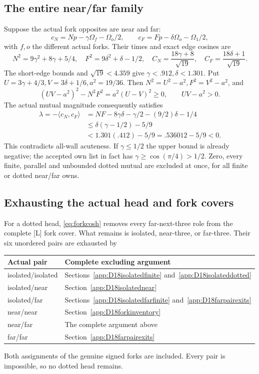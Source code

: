 \documentclass[11pt]{article}
\theoremstyle{definition}
\theoremstyle{remark}
\newcommand{\ip}[2]{\langle #1,#2\rangle}
\newcommand{\src}[1]{\textnormal{\textsf{[#1]}}}
\begin{document}
\subsection{The entire near/far family}
Suppose the actual fork opposites are near and far:
\[
 c_N=Np-\gamma\Omega_f-\Omega_o/2,\qquad
 c_F=Fp-\delta\Omega_o-\Omega_1/2,
\]
with \(f,o\) the different actual forks.
Their times and exact edge cosines are
\[
 N^2=9\gamma^2+8\gamma+5/4,\quad
 F^2=9\delta^2+\delta-1/2,\quad
 C_N=\frac{18\gamma+8}{\sqrt{19}},\quad
 C_F=\frac{18\delta+1}{\sqrt{19}}.
\]
The short-edge bounds and \(\sqrt{19}<4.359\) give
\(\gamma<.912,\delta<1.301\).
Put \(U=3\gamma+4/3,V=3\delta+1/6,a^2=19/36\).
Then \(N^2=U^2-a^2,F^2=V^2-a^2\), and
\[
 (UV-a^2)^2-N^2F^2=a^2(U-V)^2\geq0,\qquad UV-a^2>0.
\]
The actual mutual magnitude consequently satisfies
\begin{align*}
 \lambda=-\ip{c_N}{c_F}
 &=NF-8\gamma\delta-\gamma/2-(9/2)\delta-1/4\\
 &\leq\delta(\gamma-1/2)-5/9\\
 &<1.301(.412)-5/9=.536012-5/9<0.
\end{align*}
This contradicts all-wall acuteness. If \(\gamma\leq1/2\)
the upper bound is already negative; the accepted own list
in fact has \(\gamma\geq\cos(\pi/4)>1/2\).
Zero, every finite, parallel and unbounded dotted mutual
are excluded at once, for all finite or dotted near/far owns.

\subsection{Exhausting the actual head and fork covers}
For a dotted head, \eqref{eq:forkcosh} removes every
far-next-three role from the complete \src{L} fork cover.
What remains is isolated, near-three, or far-three.
Their six unordered pairs are exhausted by
\begin{center}\small
\begin{tabular}{ll}
\toprule
Actual pair&Complete excluding argument\\ \midrule
isolated/isolated&Sections~\ref{app:D18isolatedfinite} and~\ref{app:D18isolateddotted}\\
isolated/near&Section~\ref{app:D18isolatednear}\\
isolated/far&Sections~\ref{app:D18isolatedfarfinite} and~\ref{app:D18farpairexits}\\
near/near&Section~\ref{app:D18forkinventory}\\
near/far&The complete argument above\\
far/far&Section~\ref{app:D18farpairexits}\\ \bottomrule
\end{tabular}
\end{center}
Both assignments of the genuine signed forks are included.
Every pair is impossible, so no dotted head remains.
\end{document}
